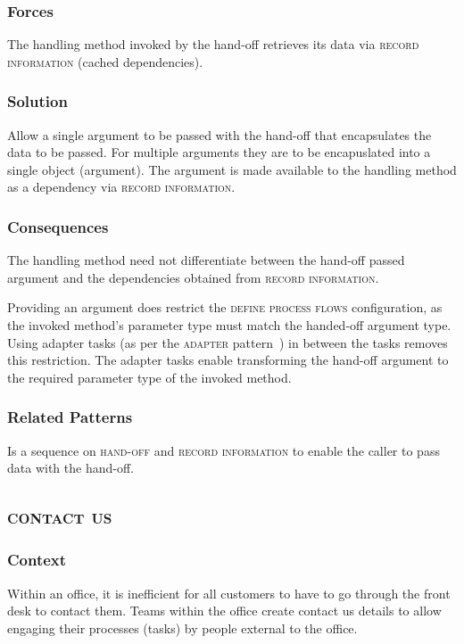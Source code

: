 \documentclass[prodmode]{style/acmlarge}
\begin{document}
\subsubsection*{Forces} The handling method invoked by the hand-off retrieves
its data via \textsc{record information} (cached dependencies).

\subsubsection*{\textbf{Solution}} Allow a single argument to be passed with the hand-off
that encapsulates the data to be passed.  For multiple arguments they are to be
encapuslated into a single object (argument).  The argument is made available to
the handling method as a dependency via \textsc{record information}.

\subsubsection*{Consequences} The handling method need not differentiate between
the hand-off passed argument and the dependencies obtained from \textsc{record
information}.

Providing an argument does restrict the \textsc{define process flows}
configuration, as the invoked method's parameter type must match the handed-off
argument type.  Using adapter tasks (as per the \textsc{adapter}
pattern~\cite{gof}) in between the tasks removes this restriction.  The adapter
tasks enable transforming the hand-off argument to the required parameter type
of the invoked method.

\subsubsection*{Related Patterns} Is a sequence on \textsc{hand-off} and
\textsc{record information} to enable the caller to pass data with the hand-off.



\subsection{\textsc{\textbf{contact us}}}

\subsubsection*{Context} Within an office, it is inefficient for all customers
to have to go through the front desk to contact them.  Teams within the office
create contact us details to allow engaging their processes (tasks) by people
external to the office.
\end{document}
